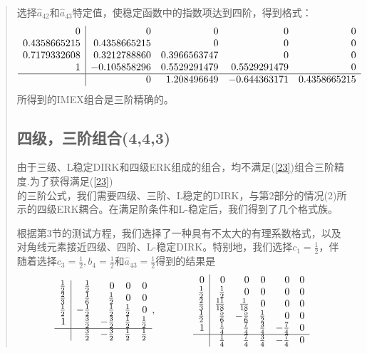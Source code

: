 \documentclass{article}
\begin{document}
\begin{CJK}{UTF8}{gkai}
\begin{quotation}
选择$\widehat{a}_{42}$和$\widehat{a}_{43}$特定值，使稳定函数中的指数项达到四阶，得到格式：
\[
\begin{array}{r|rrrr}
0 & 0 & 0 & 0 & 0 \\
0.4358665215 & 0.4358665215 & 0 &  0 & 0\\
0.7179332608 & 0.3212788860 & 0.3966563747 & 0 & 0\\
1 & -0.105858296 & 0.5529291479 & 0.5529291479 & 0\\
\hline
& 0 & 1.208496649 & -0.644363171 & 0.4358665215
\end{array}
\]
所得到的IMEX组合是三阶精确的。

\subsection{四级，三阶组合(4,4,3)}

由于三级、L稳定DIRK和四级ERK组成的组合，均不满足(\ref{23})组合三阶精度.为了获得满足(\ref{23})\\的三阶公式，我们需要四级、三阶、L稳定的DIRK，与第2部分的情况(2)所示的四级ERK耦合。在满足阶条件和L-稳定后，我们得到了几个格式族。

根据第3节的测试方程，我们选择了一种具有不太大的有理系数格式，以及对角线元素接近四级、四阶、L-稳定DIRK。特别地，我们选择$c_{1}=\frac{1}{2}$，伴随着选择$c_{3}=\frac{1}{2},b_{4}=\frac{1}{2}$和$\widehat{a}_{43}=\frac{1}{2}$得到的结果是
\[
\begin{array}{r|rrrr}
\frac{1}{2} & \frac{1}{2} & 0 & 0 & 0\\
\frac{2}{3} & \frac{1}{6} & \frac{1}{2} & 0 & 0 \\
\frac{1}{2} & -\frac{1}{2} & \frac{1}{2} & \frac{1}{2} & 0 \\
1 & \frac{3}{2} & -\frac{3}{2} & \frac{1}{2} & \frac{1}{2} \\
\hline
& \frac{3}{2} & -\frac{3}{2} & \frac{1}{2} & \frac{1}{2} 
\end{array},~~~~~~~~~~~
\begin{array}{r|rrrrr}
0 & 0 & 0 & 0 & 0 & 0 \\
\frac{1}{2} & \frac{1}{2} & 0 & 0 & 0 & 0\\
\frac{2}{3} & \frac{11}{18} & \frac{1}{18} & 0 & 0 & 0\\
\frac{1}{2} & \frac{5}{6} & -\frac{5}{6} & \frac{1}{2} & 0 & 0\\
1 & \frac{1}{4} & \frac{7}{4} & \frac{3}{4} & -\frac{7}{4} & 0\\
\hline
& \frac{1}{4} & \frac{7}{4} & \frac{3}{4} & -\frac{7}{4} & 0
\end{array}
\]


\end{quotation}
\end{CJK}
\end{document}
